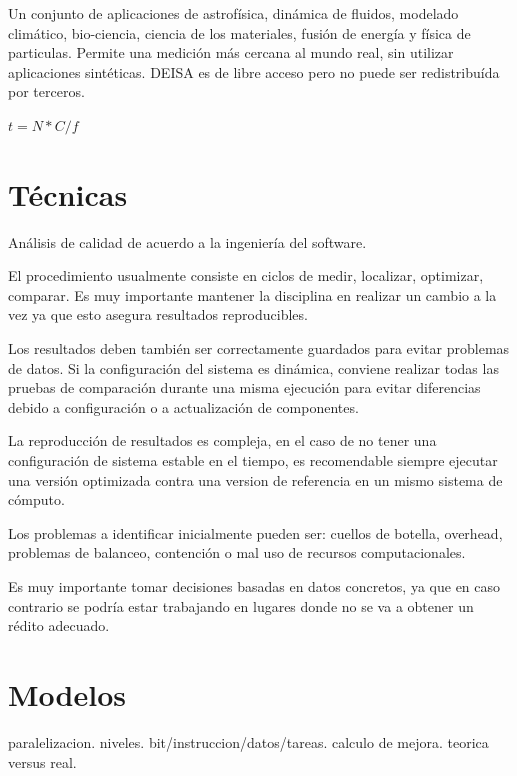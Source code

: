 \documentclass[a4paper]{report}
\begin{document}
Un conjunto de aplicaciones de astrof\'isica, din\'amica de fluidos, modelado
clim\'atico, bio-ciencia, ciencia de los materiales, fusi\'on de energ\'ia y
f\'isica de particulas. Permite una medici\'on m\'as cercana al mundo real,
sin utilizar aplicaciones sint\'eticas. DEISA es de libre acceso pero no puede
ser redistribu\'ida por terceros.

\bigskip

$ t = N * C / f $

\section{T\'ecnicas}

An\'alisis de calidad de acuerdo a la ingenier\'ia del software.

\bigskip

El procedimiento usualmente consiste en ciclos de medir, localizar, optimizar,
comparar. Es muy importante mantener la disciplina en realizar un cambio a la
vez ya que esto asegura resultados reproducibles.

\bigskip

Los resultados deben tambi\'en ser correctamente guardados para evitar
problemas de datos. Si la configuraci\'on del sistema es din\'amica, conviene
realizar todas las pruebas de comparaci\'on durante una misma ejecuci\'on para
evitar diferencias debido a configuraci\'on o a actualizaci\'on de componentes.

\bigskip

La reproducci\'on de resultados es compleja, en el caso de no tener una
configuraci\'on de sistema estable en el tiempo, es recomendable siempre
ejecutar una versi\'on optimizada contra una version de referencia en un mismo
sistema de c\'omputo.

\bigskip

Los problemas a identificar inicialmente pueden ser: cuellos de botella,
overhead, problemas de balanceo, contenci\'on o mal uso de recursos
computacionales.

\bigskip

Es muy importante tomar decisiones basadas en datos concretos, ya que en
caso contrario se podr\'ia estar trabajando en lugares donde no se va a obtener
un r\'edito adecuado.

\section{Modelos}

paralelizacion. niveles. bit/instruccion/datos/tareas.
calculo de mejora. teorica versus real. 
\end{document}
